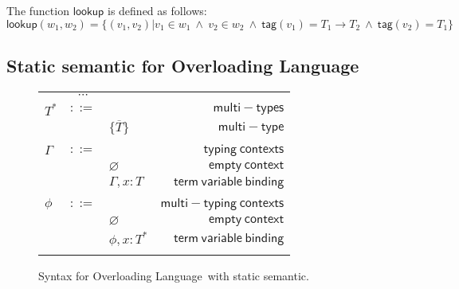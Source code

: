 \documentclass[preprint,authoryear,sort&compress,9pt,nocopyrightspace]{article}
\newcommand{\lab}{\mathsf{tag}}
\newcommand{\buscar}{\mathsf{lookup}}
\newcommand{\semanticD}{Overloading Language}
\newcommand{\mtP}[1]{#1^{*}}
\newcommand{\mtC}[1]{\{\overline {#1}\}}
\newcommand{\emt}{\phi}
\begin{document}
\begin{definition}[$\buscar$]
\label{definition:tcs}
\mbox{}
The function $\buscar$ is defined  as follows:
\[ \buscar(w_1, w_2) =  
  \{(v_1, v_2) | v_1 \in w_1 \ \wedge \ v_2 \in w_2 \ \wedge \ \lab(v_1) = T_1 \to T_2 \ \wedge \ \lab(v_2) = T_1\}
\]
\end{definition}



\subsection{Static semantic for \semanticD}



\begin{figure}
\begin{small}
\begin{center}
\begin{tabular}{|l c l r|}
\hline
&$\cdots$&&\\
$\mtP{T}$&$::=$&&$\mathsf {multi-types}$\\
&&$\mtC{T}$&$\mathsf {multi-type}$\\
&&&\\
$\Gamma$&$::=$&&$\mathsf {typing \ contexts}$\\
&&$\varnothing$&$\mathsf {empty \ context}$\\
&&$\Gamma , x:T$&$\mathsf {term \ variable \ binding}$\\
&&&\\
$\emt$&$::=$&&$\mathsf {multi-typing \ contexts}$\\
&&$\varnothing$&$\mathsf {empty \ context}$\\
&&$\emt,x: \mtP{T}$&$\mathsf {term \ variable \ binding}$\\
&&&\\
\hline
\end{tabular}
\caption{Syntax for \semanticD \ with static semantic. }
\label{tabla:syntaxstatic}
\end{center}
\end{small}
\end{figure}
\end{document}
